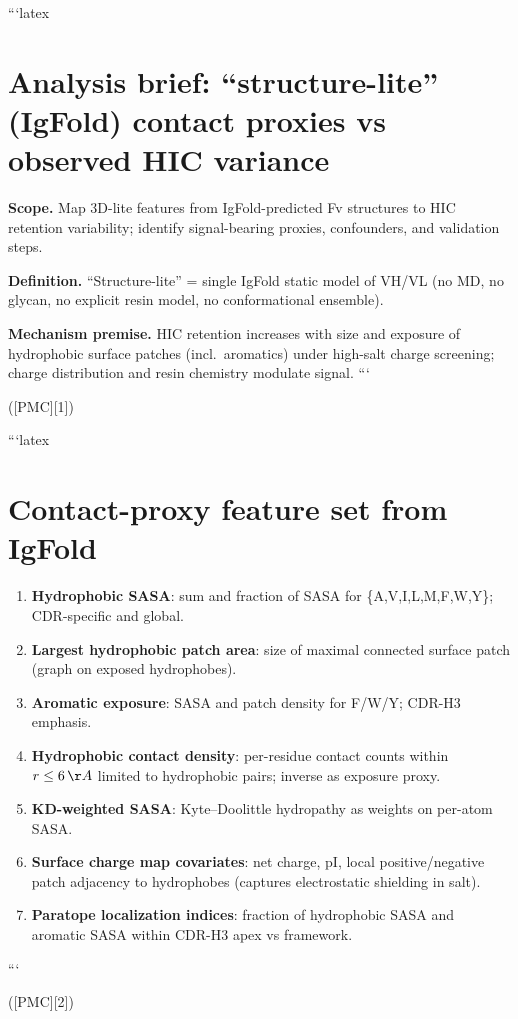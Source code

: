 ```latex
\section*{Analysis brief: “structure-lite” (IgFold) contact proxies vs observed HIC variance}

\textbf{Scope.} Map 3D-lite features from IgFold-predicted Fv structures to HIC retention variability; identify signal-bearing proxies, confounders, and validation steps.

\textbf{Definition.} “Structure-lite” = single IgFold static model of VH/VL (no MD, no glycan, no explicit resin model, no conformational ensemble).

\textbf{Mechanism premise.} HIC retention increases with size and exposure of hydrophobic surface patches (incl.\ aromatics) under high-salt charge screening; charge distribution and resin chemistry modulate signal.
```

([PMC][1])

```latex
\section*{Contact-proxy feature set from IgFold}

\begin{enumerate}\itemsep0.2em
\item \textbf{Hydrophobic SASA}: sum and fraction of SASA for \{A,V,I,L,M,F,W,Y\}; CDR-specific and global.
\item \textbf{Largest hydrophobic patch area}: size of maximal connected surface patch (graph on exposed hydrophobes).
\item \textbf{Aromatic exposure}: SASA and patch density for F/W/Y; CDR-H3 emphasis.
\item \textbf{Hydrophobic contact density}: per-residue contact counts within $r\le6\,\AA$ limited to hydrophobic pairs; inverse as exposure proxy.
\item \textbf{KD-weighted SASA}: Kyte–Doolittle hydropathy as weights on per-atom SASA.
\item \textbf{Surface charge map covariates}: net charge, pI, local positive/negative patch adjacency to hydrophobes (captures electrostatic shielding in salt).
\item \textbf{Paratope localization indices}: fraction of hydrophobic SASA and aromatic SASA within CDR-H3 apex vs framework.
\end{enumerate}
```

([PMC][2])

